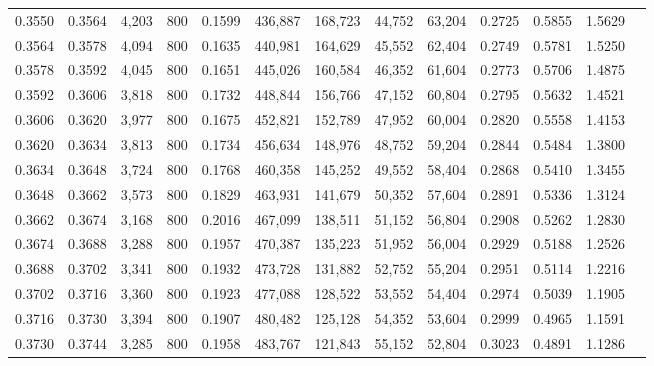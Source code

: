 \begin{tabular}{rrrrrrrrrrrrr}
0.3550 & 0.3564 &  4,203 &   800 &                                     0.1599 & 436,887 & 168,723 &  44,752 &  63,204 & 0.2725 & 0.5855 & 1.5629 \\
0.3564 & 0.3578 &  4,094 &   800 &                                     0.1635 & 440,981 & 164,629 &  45,552 &  62,404 & 0.2749 & 0.5781 & 1.5250 \\
0.3578 & 0.3592 &  4,045 &   800 &                                     0.1651 & 445,026 & 160,584 &  46,352 &  61,604 & 0.2773 & 0.5706 & 1.4875 \\
0.3592 & 0.3606 &  3,818 &   800 &                                     0.1732 & 448,844 & 156,766 &  47,152 &  60,804 & 0.2795 & 0.5632 & 1.4521 \\
0.3606 & 0.3620 &  3,977 &   800 &                                     0.1675 & 452,821 & 152,789 &  47,952 &  60,004 & 0.2820 & 0.5558 & 1.4153 \\
0.3620 & 0.3634 &  3,813 &   800 &                                     0.1734 & 456,634 & 148,976 &  48,752 &  59,204 & 0.2844 & 0.5484 & 1.3800 \\
0.3634 & 0.3648 &  3,724 &   800 &                                     0.1768 & 460,358 & 145,252 &  49,552 &  58,404 & 0.2868 & 0.5410 & 1.3455 \\
0.3648 & 0.3662 &  3,573 &   800 &                                     0.1829 & 463,931 & 141,679 &  50,352 &  57,604 & 0.2891 & 0.5336 & 1.3124 \\
0.3662 & 0.3674 &  3,168 &   800 &                                     0.2016 & 467,099 & 138,511 &  51,152 &  56,804 & 0.2908 & 0.5262 & 1.2830 \\
0.3674 & 0.3688 &  3,288 &   800 &                                     0.1957 & 470,387 & 135,223 &  51,952 &  56,004 & 0.2929 & 0.5188 & 1.2526 \\
0.3688 & 0.3702 &  3,341 &   800 &                                     0.1932 & 473,728 & 131,882 &  52,752 &  55,204 & 0.2951 & 0.5114 & 1.2216 \\
0.3702 & 0.3716 &  3,360 &   800 &                                     0.1923 & 477,088 & 128,522 &  53,552 &  54,404 & 0.2974 & 0.5039 & 1.1905 \\
0.3716 & 0.3730 &  3,394 &   800 &                                     0.1907 & 480,482 & 125,128 &  54,352 &  53,604 & 0.2999 & 0.4965 & 1.1591 \\
0.3730 & 0.3744 &  3,285 &   800 &                                     0.1958 & 483,767 & 121,843 &  55,152 &  52,804 & 0.3023 & 0.4891 & 1.1286 \\

\end{tabular}
